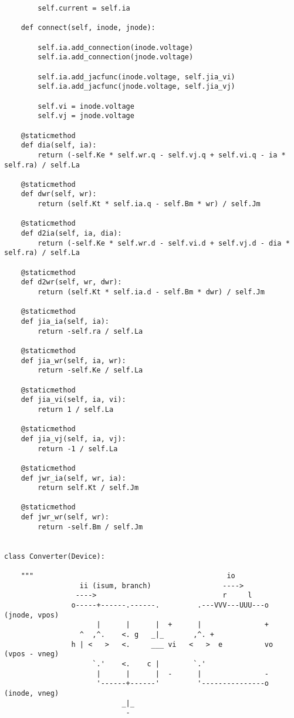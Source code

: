 \begin{lstlisting}
        self.current = self.ia

    def connect(self, inode, jnode):

        self.ia.add_connection(inode.voltage)
        self.ia.add_connection(jnode.voltage)

        self.ia.add_jacfunc(inode.voltage, self.jia_vi)
        self.ia.add_jacfunc(jnode.voltage, self.jia_vj)

        self.vi = inode.voltage
        self.vj = jnode.voltage

    @staticmethod
    def dia(self, ia):
        return (-self.Ke * self.wr.q - self.vj.q + self.vi.q - ia * self.ra) / self.La

    @staticmethod
    def dwr(self, wr):
        return (self.Kt * self.ia.q - self.Bm * wr) / self.Jm

    @staticmethod
    def d2ia(self, ia, dia):
        return (-self.Ke * self.wr.d - self.vi.d + self.vj.d - dia * self.ra) / self.La

    @staticmethod
    def d2wr(self, wr, dwr):
        return (self.Kt * self.ia.d - self.Bm * dwr) / self.Jm

    @staticmethod
    def jia_ia(self, ia):
        return -self.ra / self.La

    @staticmethod
    def jia_wr(self, ia, wr):
        return -self.Ke / self.La

    @staticmethod
    def jia_vi(self, ia, vi):
        return 1 / self.La

    @staticmethod
    def jia_vj(self, ia, vj):
        return -1 / self.La

    @staticmethod
    def jwr_ia(self, wr, ia):
        return self.Kt / self.Jm

    @staticmethod
    def jwr_wr(self, wr):
        return -self.Bm / self.Jm


class Converter(Device):

    """                                              io
                  ii (isum, branch)                 ---->
                 ---->                              r     l
                o-----+------.------.         .---VVV---UUU---o  (jnode, vpos)
                      |      |      |  +      |               +
                  ^  ,^.    <. g   _|_       ,^. +
                h | <   >   <.     ___ vi   <   >  e          vo  (vpos - vneg)
                     `.'    <.    c |        `.'
                      |      |      |  -      |               -
                      '------+------'         '---------------o  (inode, vneg)
                            _|_
                             -


\end{lstlisting}
